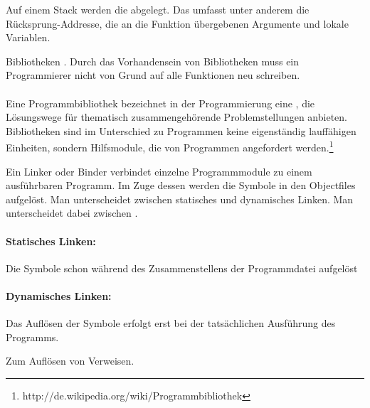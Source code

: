\begin{answer}
  Auf einem Stack werden die  abgelegt. Das umfasst unter anderem die Rücksprung-Addresse, die an die Funktion übergebenen Argumente und lokale Variablen.
\end{answer}

\begin{answer}
  Bibliotheken . Durch das Vorhandensein von Bibliotheken muss ein Programmierer nicht von Grund auf alle Funktionen neu schreiben.

  \paragraph{}
  Eine Programmbibliothek bezeichnet in der Programmierung eine , die Lösungswege für thematisch zusammengehörende Problemstellungen anbieten. Bibliotheken sind im Unterschied zu Programmen keine eigenständig lauffähigen Einheiten, sondern Hilfsmodule, die von Programmen angefordert werden.\footnote{http://de.wikipedia.org/wiki/Programmbibliothek}

\end{answer}

\begin{answer}
  Ein Linker oder Binder verbindet einzelne Programmmodule zu einem ausführbaren Programm. Im Zuge dessen werden die Symbole in den Objectfiles aufgelöst. Man unterscheidet zwischen statisches und dynamisches Linken. Man unterscheidet dabei zwischen .

  \paragraph*{Statisches Linken:}
  Die Symbole schon während des Zusammenstellens der Programmdatei aufgelöst

  \paragraph*{Dynamisches Linken:}
  Das Auflösen der Symbole erfolgt erst bei der tatsächlichen Ausführung des Programms.
\end{answer}

\begin{answer}
  Zum Auflösen von Verweisen.
\end{answer}

